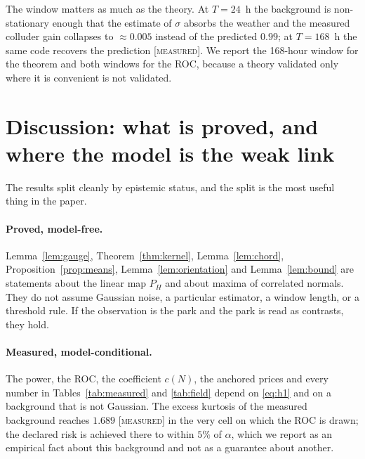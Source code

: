 \documentclass[10pt,twocolumn,a4paper]{article}
\newcommand{\measured}{\textcolor{blue!70!black}{\textsc{[measured]}}}
\theoremstyle{definition}
\theoremstyle{remark}
\newcommand{\PH}{P_{H}}
\begin{document}
The window matters as much as the theory. At $T=24$~h the background is
non-stationary enough that the estimate of $\sigma$ absorbs the weather and the
measured colluder gain collapses to $\approx0.005$ instead of the predicted
$0.99$; at $T=168$~h the same code recovers the prediction \measured. We report
the 168-hour window for the theorem and both windows for the ROC, because a
theory validated only where it is convenient is not validated.




\section{Discussion: what is proved, and where the model is the weak link}
\label{sec:limits}

The results split cleanly by epistemic status, and the split is the most useful
thing in the paper.

\paragraph{Proved, model-free.} Lemma~\ref{lem:gauge}, Theorem~\ref{thm:kernel},
Lemma~\ref{lem:chord}, Proposition~\ref{prop:means},
Lemma~\ref{lem:orientation} and Lemma~\ref{lem:bound} are statements about the
linear map $\PH$ and about maxima of correlated normals. They do not assume
Gaussian noise, a particular estimator, a window length, or a threshold rule. If
the observation is the park and the park is read as contrasts, they hold.

\paragraph{Measured, model-conditional.} The power, the ROC, the coefficient
$c(N)$, the anchored prices and every number in Tables~\ref{tab:measured} and
\ref{tab:field} depend on \eqref{eq:h1} and on a background that is not Gaussian.
The excess kurtosis of the measured background reaches $1.689$ \measured{} in the
very cell on which the ROC is drawn; the declared risk is achieved there to within
$5\%$ of $\alpha$, which we report as an empirical fact about this background and
not as a guarantee about another.
\end{document}
